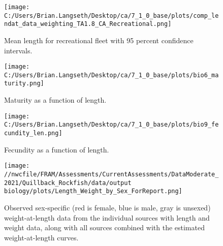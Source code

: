 \documentclass[11pt,
  english,
  letterpaper,
]{article}
\begin{document}

\begin{figure}
\centering
\texttt{[image: C:/Users/Brian.Langseth/Desktop/ca/7\_1\_0\_base/plots/comp\_lendat\_data\_weighting\_TA1.8\_CA\_Recreational.png]}
\caption{Mean length for recreational fleet with 95 percent confidence intervals.\label{fig:mean-rec-len-data}}
\end{figure}

\tagmcend\tagstructend


\begin{figure}
\centering
\texttt{[image: C:/Users/Brian.Langseth/Desktop/ca/7\_1\_0\_base/plots/bio6\_maturity.png]}
\caption{Maturity as a function of length.\label{fig:maturity}}
\end{figure}

\tagmcend\tagstructend


\begin{figure}
\centering
\texttt{[image: C:/Users/Brian.Langseth/Desktop/ca/7\_1\_0\_base/plots/bio9\_fecundity\_len.png]}
\caption{Fecundity as a function of length.\label{fig:fecundity}}
\end{figure}

\tagmcend\tagstructend


\begin{figure}
\centering
\texttt{[image: //nwcfile/FRAM/Assessments/CurrentAssessments/DataModerate\_2021/Quillback\_Rockfish/data/output biology/plots/Length\_Weight\_by\_Sex\_ForReport.png]}
\caption{Observed sex-specific (red is female, blue is male, gray is unsexed) weight-at-length data from the individual sources with length and weight data, along with all sources combined with the estimated weight-at-length curves.\label{fig:len-weight-survey}}
\end{figure}
\end{document}
